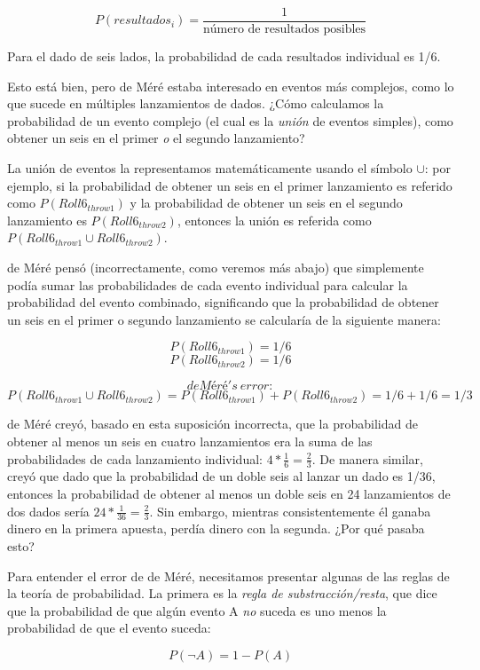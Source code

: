 \documentclass[
  12pt,
]{book}
\begin{document}
\[
P(resultados_i) = \frac{1}{\text{número de resultados posibles}}
\]

Para el dado de seis lados, la probabilidad de cada resultados individual es 1/6.

Esto está bien, pero de Méré estaba interesado en eventos más complejos, como lo que sucede en múltiples lanzamientos de dados. ¿Cómo calculamos la probabilidad de un evento complejo (el cual es la \emph{unión} de eventos simples), como obtener un seis en el primer \emph{o} el segundo lanzamiento?

La unión de eventos la representamos matemáticamente usando el símbolo \(\cup\): por ejemplo, si la probabilidad de obtener un seis en el primer lanzamiento es referido como \(P(Roll6_{throw1})\) y la probabilidad de obtener un seis en el segundo lanzamiento es \(P(Roll6_{throw2})\), entonces la unión es referida como \(P(Roll6_{throw1} \cup Roll6_{throw2})\).

de Méré pensó (incorrectamente, como veremos más abajo) que simplemente podía sumar las probabilidades de cada evento individual para calcular la probabilidad del evento combinado, significando que la probabilidad de obtener un seis en el primer o segundo lanzamiento se calcularía de la siguiente manera:

\[
P(Roll6_{throw1}) = 1/6
\]
\[
P(Roll6_{throw2}) = 1/6
\]

\[
de Méré's \ error:
\]
\[
P(Roll6_{throw1} \cup Roll6_{throw2}) = P(Roll6_{throw1}) + P(Roll6_{throw2}) = 1/6 + 1/6 = 1/3
\]

de Méré creyó, basado en esta suposición incorrecta, que la probabilidad de obtener al menos un seis en cuatro lanzamientos era la suma de las probabilidades de cada lanzamiento individual: \(4*\frac{1}{6}=\frac{2}{3}\). De manera similar, creyó que dado que la probabilidad de un doble seis al lanzar un dado es 1/36, entonces la probabilidad de obtener al menos un doble seis en 24 lanzamientos de dos dados sería \(24*\frac{1}{36}=\frac{2}{3}\). Sin embargo, mientras consistentemente él ganaba dinero en la primera apuesta, perdía dinero con la segunda. ¿Por qué pasaba esto?

Para entender el error de de Méré, necesitamos presentar algunas de las reglas de la teoría de probabilidad. La primera es la \emph{regla de substracción/resta}, que dice que la probabilidad de que algún evento A \emph{no} suceda es uno menos la probabilidad de que el evento suceda:

\[
P(\neg A) = 1 - P(A)
\]
\end{document}
